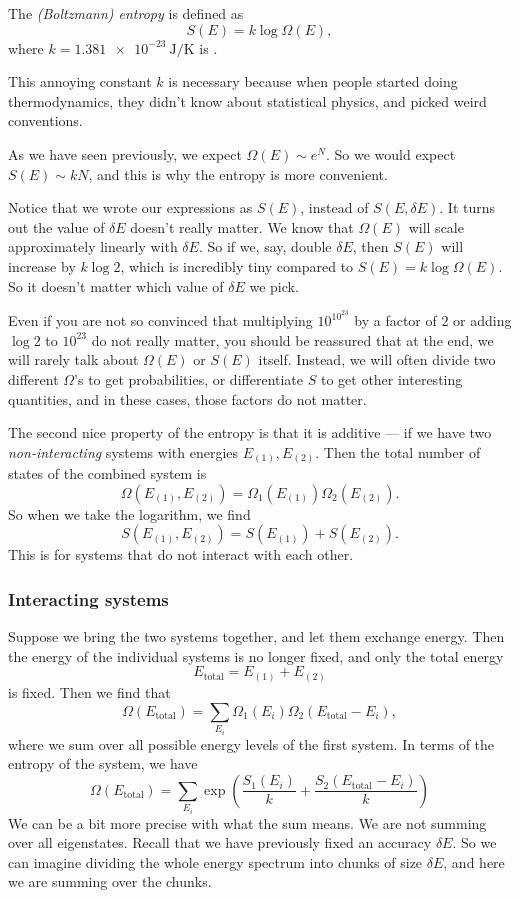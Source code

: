 \documentclass[a4paper]{article}
\begin{document}
\begin{defi}
  The \emph{(Boltzmann) entropy} is defined as
  \[
    S(E) = k \log \Omega(E),
  \]
  where $k = \SI{1.381e-23}{\joule\per\kelvin}$ is .
\end{defi}
This annoying constant $k$ is necessary because when people started doing thermodynamics, they didn't know about statistical physics, and picked weird conventions.

As we have seen previously, we expect $\Omega(E) \sim e^N$. So we would expect $S(E) \sim kN$, and this is why the entropy is more convenient.

Notice that we wrote our expressions as $S(E)$, instead of $S(E, \delta E)$. It turns out the value of $\delta E$ doesn't really matter. We know that $\Omega(E)$ will scale approximately linearly with $\delta E$. So if we, say, double $\delta E$, then $S(E)$ will increase by $k \log 2$, which is incredibly tiny compared to $S(E) = k \log \Omega(E)$. So it doesn't matter which value of $\delta E$ we pick.

Even if you are not so convinced that multiplying $10^{10^{23}}$ by a factor of $2$ or adding $\log 2$ to $10^{23}$ do not really matter, you should be reassured that at the end, we will rarely talk about $\Omega(E)$ or $S(E)$ itself. Instead, we will often divide two different $\Omega$'s to get probabilities, or differentiate $S$ to get other interesting quantities, and in these cases, those factors do not matter.


The second nice property of the entropy is that it is additive --- if we have two \emph{non-interacting} systems with energies $E_{(1)}, E_{(2)}$. Then the total number of states of the combined system is
\[
  \Omega(E_{(1)}, E_{(2)}) = \Omega_{1}(E_{(1)})\Omega_{2} (E_{(2)}).
\]
So when we take the logarithm, we find
\[
  S(E_{(1)}, E_{(2)}) = S(E_{(1)}) + S(E_{(2)}).
\]
This is for systems that do not interact with each other.

\subsubsection*{Interacting systems}
Suppose we bring the two systems together, and let them exchange energy. Then the energy of the individual systems is no longer fixed, and only the total energy
\[
  E_{\mathrm{total}} = E_{(1)} + E_{(2)}
\]
is fixed. Then we find that
\[
  \Omega(E_{\mathrm{total}}) = \sum_{E_i} \Omega_1(E_i) \Omega_2(E_{\mathrm{total}} - E_i),
\]
where we sum over all possible energy levels of the first system. In terms of the entropy of the system, we have
\[
  \Omega(E_{\mathrm{total}}) = \sum_{E_i} \exp\left(\frac{S_1(E_i)}{k} + \frac{S_2(E_{\mathrm{total}} - E_i)}{k}\right)
\]
We can be a bit more precise with what the sum means. We are not summing over all eigenstates. Recall that we have previously fixed an accuracy $\delta E$. So we can imagine dividing the whole energy spectrum into chunks of size $\delta E$, and here we are summing over the chunks.
\end{document}

